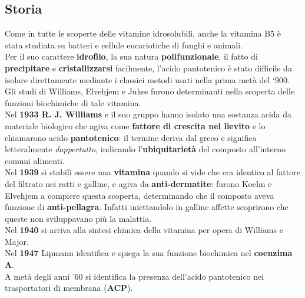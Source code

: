 \documentclass[a4paper, 12pt]{article}
\begin{document}
\subsection{Storia}
Come in tutte le scoperte delle vitamine idrosolubili, anche la vitamina B5 è stata studiata su batteri e cellule eucariotiche di funghi e animali.\\
Per il suo carattere \textbf{idrofilo}, la sua natura \textbf{polifunzionale}, il fatto di \textbf{precipitare} e \textbf{cristallizzarsi} facilmente, l’acido pantotenico è stato difficile da isolare direttamente mediante i classici metodi usati nella prima metà del ‘900.\\
Gli studi di Williams, Elvehjem e Jukes furono determinanti nella scoperta delle funzioni biochimiche di tale vitamina.\\
Nel \textbf{1933 R. J. Williams} e il suo gruppo hanno isolato una sostanza acida da materiale biologico che agiva come \textbf{fattore di crescita nel lievito} e lo chiamarono acido \textbf{pantotenico}: il termine deriva dal greco e significa letteralmente \textit{dappertutto}, indicando l'\textbf{ubiquitarietà} del composto all'interno comuni alimenti.\\
Nel \textbf{1939} si stabilì essere una \textbf{vitamina} quando si vide che era identico al fattore del filtrato nei ratti e galline, e agiva da \textbf{anti-dermatite}: furono Koehn e Elvehjem a compiere questa scoperta, determinando che il composto aveva funzione di \textbf{anti-pellagra}. Infatti iniettandolo in galline affette scoprirono che queste non sviluppavano più la malattia.\\
Nel \textbf{1940} si arriva alla sintesi chimica della vitamina per opera di Williams e Major.\\
Nel \textbf{1947} Lipmann identifica e spiega la sua funzione biochimica nel \textbf{coenzima A}.\\
A metà degli anni ’60 si identifica la presenza dell’acido pantotenico nei trasportatori di membrana (\textbf{ACP}).
\end{document}
